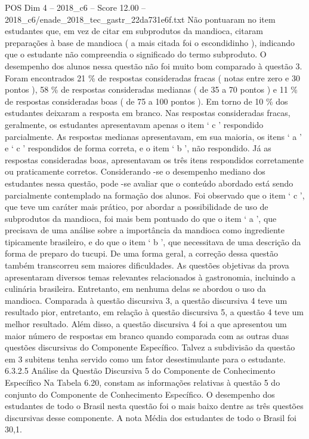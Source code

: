 \begin{textsample}{POS Dim 4 – 2018\_c6 – Score 12.00 – 2018\_c6/enade\_2018\_tec\_gastr\_22da731e6f.txt}
Não pontuaram no item estudantes que, em vez de citar em subprodutos da mandioca, citaram preparações à base de mandioca ( a mais citada foi o escondidinho ), indicando que o estudante não compreendia o significado do termo subproduto.
O desempenho dos alunos nessa questão não foi muito bom comparado à questão 3.
Foram encontrados 21 \% de respostas consideradas fracas ( notas entre zero e 30 pontos ), 58 \% de respostas consideradas medianas ( de 35 a 70 pontos ) e 11 \% de respostas consideradas boas ( de 75 a 100 pontos ).
Em torno de 10 \% dos estudantes deixaram a resposta em branco.
Nas respostas consideradas fracas, geralmente, os estudantes apresentavam apenas o item ‘ c ’ respondido parcialmente.
As respostas medianas apresentavam, em sua maioria, os itens ‘ a ’ e ‘ c ’ respondidos de forma correta, e o item ‘ b ’, não respondido.
Já as respostas consideradas boas, apresentavam os três itens respondidos corretamente ou praticamente corretos.
Considerando -se o desempenho mediano dos estudantes nessa questão, pode -se avaliar que o conteúdo abordado está sendo parcialmente contemplado na formação dos alunos.
Foi observado que o item ‘ c ’, que teve um caráter mais prático, por abordar a possibilidade de uso de subprodutos da mandioca, foi mais bem pontuado do que o item ‘ a ’, que precisava de uma análise sobre a importância da mandioca como ingrediente tipicamente brasileiro, e do que o item ‘ b ’, que necessitava de uma descrição da forma de preparo do tucupi.
De uma forma geral, a correção dessa questão também transcorreu sem maiores dificuldades.
As questões objetivas da prova apresentaram diversos temas relevantes relacionados à gastronomia, incluindo a culinária brasileira.
Entretanto, em nenhuma delas se abordou o uso da mandioca.
Comparada à questão discursiva 3, a questão discursiva 4 teve um resultado pior, entretanto, em relação à questão discursiva 5, a questão 4 teve um melhor resultado.
Além disso, a questão discursiva 4 foi a que apresentou um maior número de respostas em branco quando comparada com as outras duas questões discursivas do Componente Específico.
Talvez a subdivisão da questão em 3 subitens tenha servido como um fator desestimulante para o estudante. 6.3.2.5 Análise da Questão Discursiva 5 do Componente de Conhecimento Específico Na Tabela 6.20, constam as informações relativas à questão 5 do conjunto do Componente de Conhecimento Específico.
O desempenho dos estudantes de todo o Brasil nesta questão foi o mais baixo dentre as três questões discursivas desse componente.
A nota Média dos estudantes de todo o Brasil foi 30,1.

\end{textsample}
